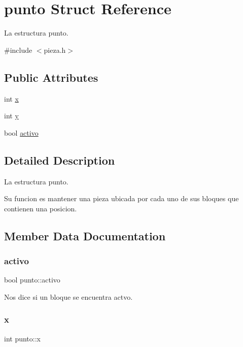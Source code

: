\hypertarget{structpunto}{}\section{punto Struct Reference}
\label{structpunto}


La estructura punto.  




{\ttfamily \#include $<$pieza.\+h$>$}

\subsection*{Public Attributes}
\begin{DoxyCompactItemize}
\item 
int \hyperlink{structpunto_a258126d731de858fa7dc4a24f83c3f7d}{x}
\item 
int \hyperlink{structpunto_a31195a01422c6e9574235d9b0bf8d285}{y}
\item 
bool \hyperlink{structpunto_afed058e11446615359734c4ddffaa29c}{activo}
\end{DoxyCompactItemize}


\subsection{Detailed Description}
La estructura punto. 

Su funcion es mantener una pieza ubicada por cada uno de sus bloques que contienen una posicion. 

\subsection{Member Data Documentation}
\mbox{\label{structpunto_afed058e11446615359734c4ddffaa29c}} 
\subsubsection{\texorpdfstring{activo}{activo}}
{\footnotesize\ttfamily bool punto\+::activo}

Nos dice si un bloque se encuentra actvo. \mbox{\label{structpunto_a258126d731de858fa7dc4a24f83c3f7d}} 
\subsubsection{\texorpdfstring{x}{x}}
{\footnotesize\ttfamily int punto\+::x}

